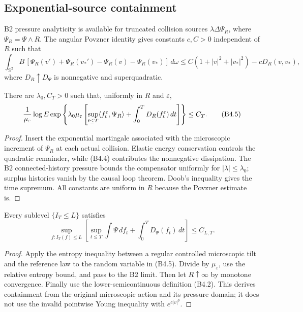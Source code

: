 \subsection{Exponential-source containment}

B2 pressure analyticity is available for truncated collision sources
$\lambda\Delta\Psi_R$, where
$\Psi_R=\Psi\wedge R$.  The angular Povzner identity gives constants
$c,C>0$ independent of $R$ such that
\[
 \int_{\mathbb S^2}B\,
 [\Psi_R(v')+\Psi_R(v_*')-\Psi_R(v)-\Psi_R(v_*)]\,d\omega
 \le C(1+|v|^2+|v_*|^2)-cD_R(v,v_*),                     \tag{B4.4}
\]
where $D_R\uparrow D_\Psi$ is nonnegative and superquadratic.

\begin{lemma}
\label{lem:r27-b4-source}
There are $\lambda_0,C_T>0$ such that, uniformly in $R$ and $\varepsilon$,
\[
 {1\over\mu_\varepsilon}\log
 E\exp\left\{\lambda_0\mu_\varepsilon
 \left[\sup_{t\le T}\langle f_t^\varepsilon,\Psi_R\rangle
       +\int_0^TD_R(f_t^\varepsilon)\,dt\right]\right\}
 \le C_T.                                                 \tag{B4.5}
\]
\end{lemma}

\begin{proof}
Insert the exponential martingale associated with the microscopic increment
of $\Psi_R$ at each actual collision.  Elastic energy conservation controls
the quadratic remainder, while (B4.4) contributes the nonnegative
dissipation.  The B2 connected-history pressure bounds the compensator
uniformly for $|\lambda|\le\lambda_0$; surplus histories vanish by the causal
loop theorem.  Doob's inequality gives the time supremum.  All constants are
uniform in $R$ because the Povzner estimate is.
\end{proof}

\begin{theorem}
\label{thm:r27-b4-containment}
Every sublevel $\{I_T\le L\}$ satisfies
\[
 \sup_{f:I_T(f)\le L}\left[
 \sup_{t\le T}\int\Psi\,df_t+\int_0^TD_\Psi(f_t)\,dt
 \right]\le C_{L,T}.                                     \tag{B4.6}
\]
\end{theorem}

\begin{proof}
Apply the entropy inequality between a regular controlled microscopic tilt and
the reference law to the random variable in (B4.5).  Divide by
$\mu_\varepsilon$, use the relative entropy bound, and pass to the B2 limit.
Then let $R\uparrow\infty$ by monotone convergence.  Finally use the
lower-semicontinuous definition (B4.2).  This derives containment from the
original microscopic action and its pressure domain; it does not use the
invalid pointwise Young inequality with $e^{c|v|^p}$.
\end{proof}

